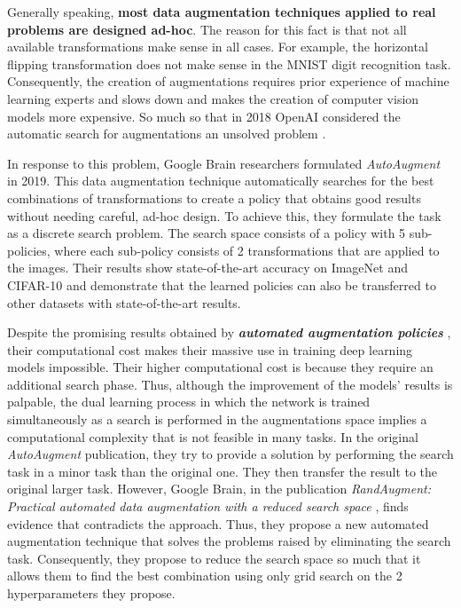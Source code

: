 Generally speaking, \textbf{most data augmentation techniques applied to real problems are designed ad-hoc}. The reason for this fact is that not all available transformations make sense in all cases. For example, the horizontal flipping transformation does not make sense in the MNIST digit recognition task. Consequently, the creation of augmentations requires prior experience of machine learning experts and slows down and makes the creation of computer vision models more expensive. So much so that in 2018 OpenAI considered the automatic search for augmentations an unsolved problem \cite{requestsresearch}.

In response to this problem, Google Brain researchers formulated \textit{AutoAugment} \cite{cubuk2018autoaugment} in 2019. This data augmentation technique automatically searches for the best combinations of transformations to create a policy that obtains good results without needing careful, ad-hoc design. To achieve this, they formulate the task as a discrete search problem. The search space consists of a policy with 5 sub-policies, where each sub-policy consists of 2 transformations that are applied to the images. Their results show state-of-the-art accuracy on ImageNet and CIFAR-10 and demonstrate that the learned policies can also be transferred to other datasets with state-of-the-art results.

Despite the promising results obtained by \textit{\textbf{automated augmentation policies}} \cite{cubuk2018autoaugment}, their computational cost makes their massive use in training deep learning models impossible. Their higher computational cost is because they require an additional search phase. Thus, although the improvement of the models' results is palpable, the dual learning process in which the network is trained simultaneously as a search is performed in the augmentations space implies a computational complexity that is not feasible in many tasks. In the original \textit{AutoAugment} publication, they try to provide a solution by performing the search task in a minor task than the original one. They then transfer the result to the original larger task. However, Google Brain, in the publication \textit{RandAugment: Practical automated data augmentation with a reduced search space} \cite{cubuk2020randaugment}, finds evidence that contradicts the approach. Thus, they propose a new automated augmentation technique that solves the problems raised by eliminating the search task. Consequently, they propose to reduce the search space so much that it allows them to find the best combination using only grid search on the 2 hyperparameters they propose.

